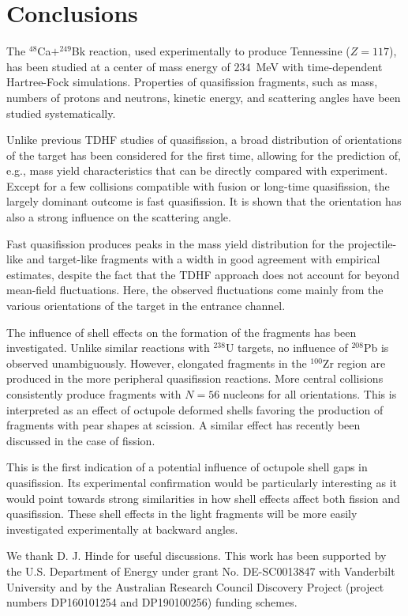 \documentclass[reprint,aps,prc,twocolumn,floatfix,10pt]{revtex4-2}
\begin{document}
\section{Conclusions}\label{sec:conclusion}

The $^{48}$Ca$+^{249}$Bk reaction, used experimentally to produce Tennessine ($Z=117$), has been studied at a center of mass energy of $234$~MeV with time-dependent Hartree-Fock simulations.
Properties of quasifission fragments, such as mass, numbers of protons and neutrons, kinetic energy, and scattering angles have been studied systematically.

Unlike previous TDHF studies of quasifission, a broad distribution of orientations of the target has been considered for the first time, allowing for the prediction of, e.g.,  mass yield characteristics that can be directly compared with experiment.
Except for a few collisions compatible with fusion or long-time quasifission, the largely dominant outcome is fast quasifission.
It is shown that the orientation has also a strong influence on the scattering angle.

Fast quasifission produces peaks in the mass yield distribution for the projectile-like and target-like fragments with a width in good agreement with empirical estimates, despite the fact that the TDHF approach does not account for beyond mean-field fluctuations.
Here, the observed fluctuations come mainly from the various orientations of the target in the entrance channel.

The influence of shell effects on the formation of the fragments has been investigated.
Unlike similar reactions with $^{238}$U targets, no influence of $^{208}$Pb is observed unambiguously.
However, elongated fragments in the $^{100}$Zr region are produced in the more peripheral quasifission reactions.
More central collisions consistently produce fragments with $N=56$ nucleons for all orientations.
This is interpreted as an effect of octupole deformed shells favoring the production of fragments with pear shapes at scission.
A similar effect has recently been discussed in the case of fission.

This is the first indication of a potential influence of octupole shell gaps in quasifission.
Its experimental confirmation would be particularly interesting as it would point towards strong similarities in how shell effects affect both fission and quasifission.
These shell effects in the light fragments will be more easily investigated experimentally at backward angles.

\begin{acknowledgments}
We thank D. J. Hinde for useful discussions.
This work has been supported by the U.S. Department of Energy under grant No.
DE-SC0013847 with Vanderbilt University and by the
Australian Research Council Discovery Project (project numbers DP160101254 and DP190100256) funding schemes.
\end{acknowledgments}




\end{document}
